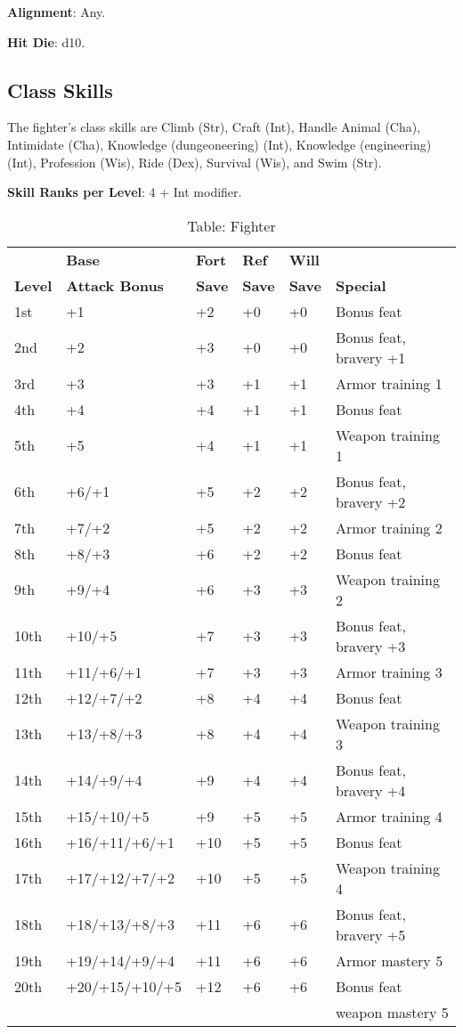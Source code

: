 \textbf{Alignment}: Any.
				
\textbf{Hit Die}: d10.
				
\subsection{Class Skills}

				
The fighter's class skills are Climb (Str), Craft (Int), Handle Animal (Cha), Intimidate (Cha), Knowledge (dungeoneering) (Int), Knowledge (engineering) (Int), Profession (Wis), Ride (Dex), Survival (Wis), and Swim (Str). 
				
\textbf{Skill Ranks per Level}: 4 + Int modifier.

\begin{table}[]
\sffamily
\fontsize{9.5}{11.4}\selectfont
\setlength{\tabcolsep}{1pt}
\caption{Table: Fighter}
\begin{tabular}{llllll}
               & \textbf{Base} & \textbf{Fort} & \textbf{Ref} & \textbf{Will}\\
\textbf{Level} & \textbf{Attack Bonus} & \textbf{Save} & \textbf{Save} & \textbf{Save} & \textbf{Special}\\
1st & +1 & +2 & +0 & +0 & Bonus feat\\
2nd & +2 & +3 & +0 & +0 & Bonus feat, bravery +1\\
3rd & +3 & +3 & +1 & +1 & Armor training 1 \\
4th & +4 & +4 & +1 & +1 & Bonus feat\\
5th & +5 & +4 & +1 & +1 & Weapon training 1\\
6th & +6/+1 & +5 & +2 & +2 & Bonus feat, bravery +2\\
7th & +7/+2 & +5 & +2 & +2 & Armor training 2\\
8th & +8/+3 & +6 & +2 & +2 & Bonus feat\\
9th & +9/+4 & +6 & +3 & +3 & Weapon training 2\\
10th & +10/+5 & +7 & +3 & +3 & Bonus feat, bravery +3\\
11th & +11/+6/+1 & +7 & +3 & +3 & Armor training 3\\
12th & +12/+7/+2 & +8 & +4 & +4 & Bonus feat\\
13th & +13/+8/+3 & +8 & +4 & +4 & Weapon training 3\\
14th & +14/+9/+4 & +9 & +4 & +4 & Bonus feat, bravery +4\\
15th & +15/+10/+5 & +9 & +5 & +5 & Armor training 4\\
16th & +16/+11/+6/+1 & +10 & +5 & +5 & Bonus feat\\
17th & +17/+12/+7/+2 & +10 & +5 & +5 & Weapon training 4\\
18th & +18/+13/+8/+3 & +11 & +6 & +6 & Bonus feat, bravery +5\\
19th & +19/+14/+9/+4 & +11 & +6 & +6 & Armor mastery 5\\
20th & +20/+15/+10/+5 & +12 & +6 & +6 & Bonus feat \\
     &                &     &    &    & weapon mastery 5\\
\end{tabular}
\end{table}
				

